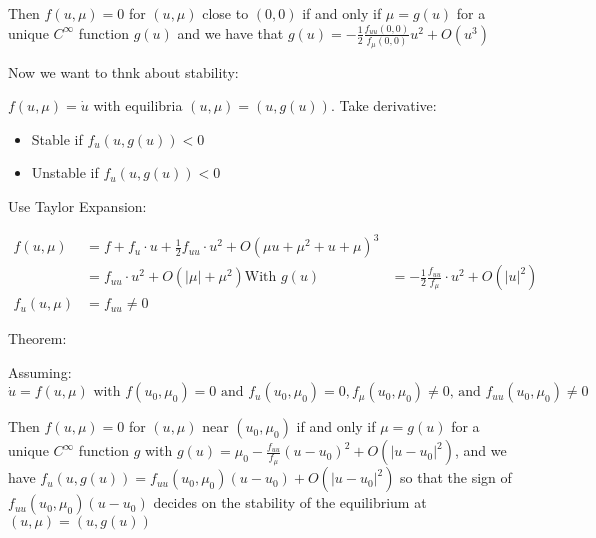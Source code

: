 \documentclass[main.tex]{subfiles}
\begin{document}
Then $f(u, \mu) = 0$ for $(u, \mu)$ close to $(0, 0)$ if and only if $\mu = g(u)$ for a unique $C^\infty$ function $g(u)$ and we have that $g(u) = -\frac{1}{2}\frac{f_{uu}(0,0)}{f_\mu(0, 0)}u^2 + O(u^3)$

Now we want to thnk about stability:

$f(u, \mu) = \dot{u}$ with equilibria $(u, \mu) = (u, g(u))$. Take derivative:

\begin{itemize}
    \item Stable if $f_u (u, g(u)) < 0$
    \item Unstable if $f_u (u, g(u)) < 0$
\end{itemize}

Use Taylor Expansion:

\begin{align}
    f(u, \mu) &= f + f_u\cdot u + \frac{1}{2}f_{uu}\cdot u^2 + O(\mu u + \mu^2 + u + \mu)^3 \\
              &= f_{uu}\cdot u^2 + O(|\mu| + \mu^2)
               \textrm{With } g(u) &= -\frac{1}{2}\frac{f_{uu}}{f_\mu}\cdot u^2 + O(|u|^2) \\
    f_u(u, \mu) &= f_{uu} \neq 0
\end{align}

Theorem:

Assuming:
$$\dot{u} = f(u, \mu) \textrm{ with } f(u_0, \mu_0) = 0 \textrm{ and } f_u(u_0,\mu_0) = 0, f_\mu(u_0, \mu_0) \neq 0\textrm{, and } f_{uu}(u_0, \mu_0) \neq 0$$

Then $f(u, \mu) = 0$ for $(u, \mu)$ near $(u_0, \mu_0)$ if and only if $\mu = g(u)$ for a unique $C^\infty$ function $g$ with $g(u) = \mu_0 - \frac{f_{uu}}{f_\mu} (u - u_0)^2 + O(|u - u_0|^2)$, and we have $f_u(u, g(u)) = f_{uu}(u_0, \mu_0)(u-u_0) + O(|u - u_0|^2)$ so that the sign of $f_{uu}(u_0, \mu_0)(u-u_0)$ decides on the stability of the equilibrium at $(u, \mu) = (u, g(u))$
\end{document}
